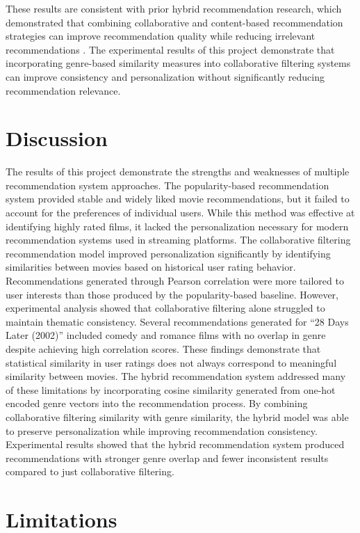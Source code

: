 \documentclass{article}
\begin{document}
These results are consistent with prior hybrid recommendation research, which demonstrated that combining collaborative and content-based recommendation strategies can improve recommendation quality while reducing irrelevant recommendations \cite{burke2002hybrid}. The experimental results of this project demonstrate that incorporating genre-based similarity measures into collaborative filtering systems can improve consistency and personalization without significantly reducing recommendation relevance.
\section{Discussion}

The results of this project demonstrate the strengths and weaknesses of multiple recommendation system approaches. The popularity-based recommendation system provided stable and widely liked movie recommendations, but it failed to account for the preferences of individual users. While this method was effective at identifying highly rated films, it lacked the personalization necessary for modern recommendation systems used in streaming platforms. The collaborative filtering recommendation model improved personalization significantly by identifying similarities between movies based on historical user rating behavior. Recommendations generated through Pearson correlation were more tailored to user interests than those produced by the popularity-based baseline. However, experimental analysis showed that collaborative filtering alone struggled to maintain thematic consistency. Several recommendations generated for ``28 Days Later (2002)'' included comedy and romance films with no overlap in genre despite achieving high correlation scores. These findings demonstrate that statistical similarity in user ratings does not always correspond to meaningful similarity between movies. The hybrid recommendation system addressed many of these limitations by incorporating cosine similarity generated from one-hot encoded genre vectors into the recommendation process. By combining collaborative filtering similarity with genre similarity, the hybrid model was able to preserve personalization while improving recommendation consistency. Experimental results showed that the hybrid recommendation system produced recommendations with stronger genre overlap and fewer inconsistent results compared to just collaborative filtering.

\section{Limitations}
\end{document}
